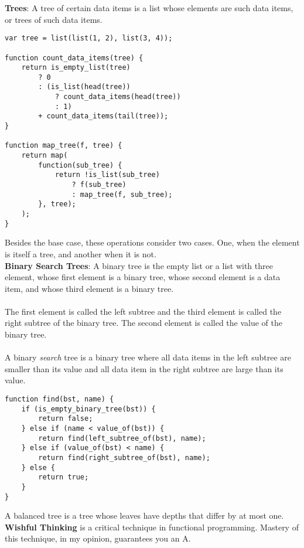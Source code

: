 \documentclass[a4paper]{article} \usepackage[backend=biber, style=numeric, sorting=none]{biblatex}
\begin{document}
\begin{multicols*}{4}
{\small\textbf{Trees}}: A tree of certain data items is a list whose elements are such data items, or trees of such data items.

\begin{verbatim}
var tree = list(list(1, 2), list(3, 4));

function count_data_items(tree) {
    return is_empty_list(tree)
        ? 0
        : (is_list(head(tree))
            ? count_data_items(head(tree))
            : 1)
        + count_data_items(tail(tree));
}

function map_tree(f, tree) {
    return map(
        function(sub_tree) {
            return !is_list(sub_tree)
                ? f(sub_tree)
                : map_tree(f, sub_tree);
        }, tree);
    );
}
\end{verbatim}

Besides the base case, these operations consider two cases. One, when the element is itself a tree, and another when it is not. \\

{\small\textbf{Binary Search Trees}}: A binary tree is the empty list or a list with three element, whose first element is a binary tree, whose second element is a data item, and whose third element is a binary tree.
\\ \\
The first element is called the left subtree and the third element is called the right subtree of the binary tree. The second element is called the value of the binary tree.
\\ \\
A binary \textit{search} tree is a binary tree where all data items in the left subtree are smaller than its value and all data item in the right subtree are large than its value.

\begin{verbatim}
function find(bst, name) {
    if (is_empty_binary_tree(bst)) {
        return false;
    } else if (name < value_of(bst)) {
        return find(left_subtree_of(bst), name);
    } else if (value_of(bst) < name) {
        return find(right_subtree_of(bst), name);
    } else {
        return true;
    }
}
\end{verbatim}

A balanced tree is a tree whose leaves have depths that differ by at most one.\\

{\small\textbf{Wishful Thinking}} is a critical technique in functional programming. Mastery of this technique, in my opinion, guarantees you an A.


\end{multicols*}
\end{document}
